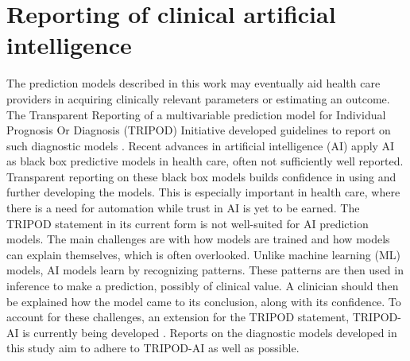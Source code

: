 \section{Reporting of clinical artificial intelligence}
The prediction models described in this work may eventually aid health care providers in acquiring clinically relevant parameters or estimating an outcome.
The Transparent Reporting of a multivariable prediction model for Individual Prognosis Or Diagnosis (TRIPOD) Initiative developed guidelines to report on such diagnostic models .
Recent advances in artificial intelligence (AI) apply AI as black box predictive models in health care, often not sufficiently well reported.
Transparent reporting on these black box models builds confidence in using and further developing the models.
This is especially important in health care, where there is a need for automation while trust in AI is yet to be earned.
The TRIPOD statement in its current form is not well-suited for AI prediction models.
The main challenges are with how models are trained and how models can explain themselves, which is often overlooked.
Unlike machine learning (ML) models, AI models learn by recognizing patterns.
These patterns are then used in inference to make a prediction, possibly of clinical value.
A clinician should then be explained how the model came to its conclusion, along with its confidence.
To account for these challenges, an extension for the TRIPOD statement, TRIPOD-AI is currently being developed .
Reports on the diagnostic models developed in this study aim to adhere to TRIPOD-AI as well as possible.
